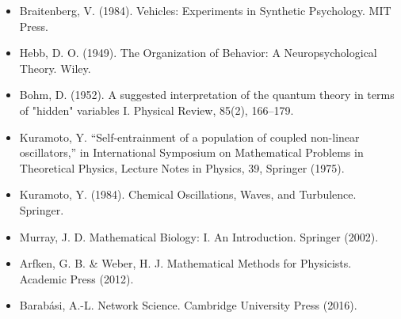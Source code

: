 \documentclass[american,11pt,letterpaper]{article}
\def\emph#1{#1}%
\begin{document}
\begin{itemize}
\item Braitenberg, V. (1984). Vehicles: Experiments in Synthetic Psychology. MIT Press.
\item Hebb, D. O. (1949). The Organization of Behavior: A Neuropsychological Theory. Wiley.
\item Bohm, D. (1952). A suggested interpretation of the quantum theory in terms of "hidden" variables I. Physical Review, 85(2), 166--179.
\item Kuramoto, Y. ``Self-entrainment of a population of coupled non-linear oscillators,'' in \emph{International Symposium on Mathematical Problems in Theoretical Physics}, Lecture Notes in Physics, 39, Springer (1975).
\item Kuramoto, Y. (1984). Chemical Oscillations, Waves, and Turbulence. Springer.
\item Murray, J. D. \emph{Mathematical Biology: I. An Introduction.} Springer (2002).
\item Arfken, G. B. \& Weber, H. J. \emph{Mathematical Methods for Physicists.} Academic Press (2012).
\item Barab\'asi, A.-L. \emph{Network Science.} Cambridge University Press (2016).


\end{itemize}
\end{document}
